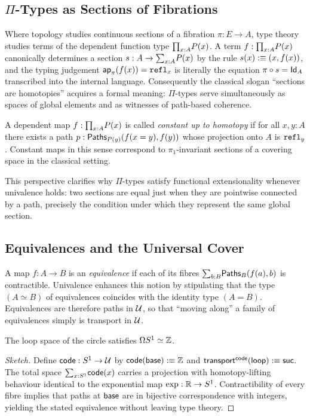 \subsection{\texorpdfstring{$\Pi$}{Π}-Types as Sections of Fibrations}\label{sec:fibrations}
Where topology studies continuous sections of a fibration
\(\pi:E\to A\), type theory studies terms of the dependent function
type \(\textstyle\mathbf{\prod}_{x:A}P(x)\).  A term
\(f:\textstyle\mathbf{\prod}_{x:A}P(x)\) canonically determines a section
\(s:A\to\textstyle\mathbf{\sum}_{x:A}P(x)\) by the rule \(s(x):\equiv(x,f(x))\), and the
typing judgement \(\mathsf{ap}_{\pi}(f(x))=\texttt{refl}_x\) is literally the
equation \(\pi\circ s=\textsf{Id}_A\) transcribed into the internal language.
Consequently the classical slogan ``sections are homotopies'' acquires a
formal meaning: \(\Pi\)-types serve simultaneously as spaces of
global elements and as witnesses of path-based coherence.

\begin{definition}
  A dependent map \(f:\textstyle\mathbf{\prod}_{x:A}P(x)\) is called \emph{constant up to
    homotopy} if for all \(x,y:A\) there exists a path
  \(p:\textsf{Paths}_{P(y)}(f(x\mathrel{=}y),f(y))\) whose projection onto \(A\)
  is \(\texttt{refl}_y\).  Constant maps in this sense correspond to \(\pi_1\)-invariant
  sections of a covering space in the classical setting.
\end{definition}

This perspective clarifies why \(\Pi\)-types satisfy functional
extensionality whenever univalence holds: two sections are equal just
when they are pointwise connected by a path, precisely the condition
under which they represent the same global section.

\subsection{Equivalences and the Universal Cover}\label{sec:univalence}
A map \(f:A\to B\) is an \emph{equivalence} if each of its fibres
\(\textstyle\mathbf{\sum}_{b:B}\textsf{Paths}_B(f(a),b)\) is contractible.  Univalence enhances
this notion by stipulating that the type \((A\simeq B)\) of
equivalences coincides with the identity type \((A=B)\).  Equivalences
are therefore paths in \(\mathcal{U}\), so that ``moving along'' a family of
equivalences simply is transport in \(\mathcal{U}\).

\begin{theorem}
  \label{thm:omegaS1}
  The loop space of the circle satisfies \(\Omega S^1\simeq\mathbb{Z}\).
\end{theorem}

\begin{proof}[Sketch]
  Define \(\textsf{code}:S^1\to\mathcal{U}\) by \(\textsf{code}(\textsf{base}):\equiv\mathbb{Z}\) and
  \(\textsf{transport}^{\textsf{code}}(\textsf{loop}):\equiv\textsf{suc}\).  The total space
  \(\textstyle\mathbf{\sum}_{x:S^1}\textsf{code}(x)\) carries a projection with homotopy-lifting
  behaviour identical to the exponential map \(\exp:\mathbb{R}\to S^1\).
  Contractibility of every fibre implies that paths at \(\textsf{base}\) are in
  bijective correspondence with integers, yielding the stated
  equivalence without leaving type theory.
\end{proof}


